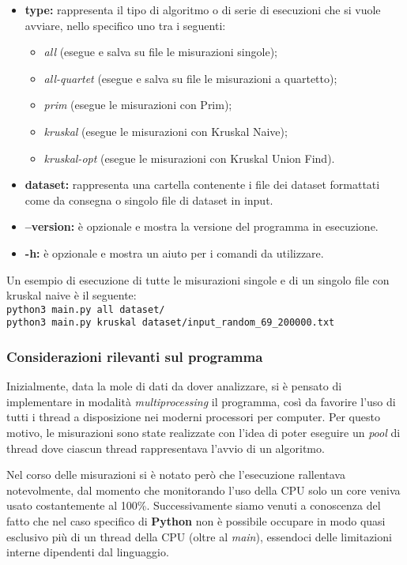 \begin{itemize}
    \item \textbf{type:} rappresenta il tipo di algoritmo o di serie di esecuzioni che si vuole avviare, nello specifico uno tra i seguenti: 
    \begin{itemize}
        \item \textit{all} (esegue e salva su file le misurazioni singole);
        \item \textit{all-quartet} (esegue e salva su file le misurazioni a quartetto);        \item \textit{prim} (esegue le misurazioni con Prim);
        \item \textit{kruskal} (esegue le misurazioni con Kruskal Naive);
        \item \textit{kruskal-opt} (esegue le misurazioni con Kruskal Union Find).   
    \end{itemize} 
    \item \textbf{dataset:} rappresenta una cartella contenente i file dei dataset formattati come da consegna o singolo file di dataset in input. 
    \item \textbf{--version:} è opzionale e mostra la versione del programma in esecuzione. 
    \item \textbf{-h:} è opzionale e mostra un aiuto per i comandi da utilizzare. 
\end{itemize}

\noindent Un esempio di esecuzione di tutte le misurazioni singole e di un singolo file con kruskal naive è il seguente: \\
\texttt{python3 main.py all dataset/} \\
\texttt{python3 main.py kruskal dataset/input\_random\_69\_200000.txt}

\subsubsection{Considerazioni rilevanti sul programma}

Inizialmente, data la mole di dati da dover analizzare, si è pensato di implementare in modalità \textit{multiprocessing} il programma, così da favorire l'uso di tutti i thread a disposizione nei moderni processori per computer. Per questo motivo, le misurazioni sono state realizzate con l'idea di poter eseguire un \textit{pool} di thread dove ciascun thread rappresentava l'avvio di un algoritmo. 

Nel corso delle misurazioni si è notato però che l'esecuzione rallentava notevolmente, dal momento che monitorando l'uso della CPU solo un core veniva usato costantemente al 100\%. Successivamente siamo venuti a conoscenza del fatto che nel caso specifico di \textbf{Python} non è possibile occupare in modo quasi esclusivo più di un thread della CPU (oltre al \textit{main}), essendoci delle limitazioni interne dipendenti dal linguaggio.

